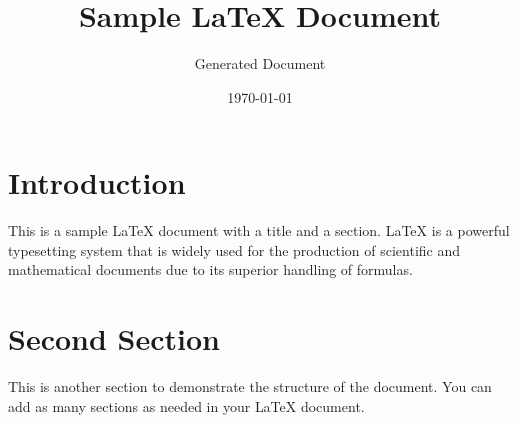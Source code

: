 \documentclass{article}
\title{Sample LaTeX Document}
\author{Generated Document}
\date{\today}
\begin{document}
\maketitle

\section{Introduction}
This is a sample LaTeX document with a title and a section. LaTeX is a powerful typesetting system that is widely used for the production of scientific and mathematical documents due to its superior handling of formulas.

\section{Second Section}
This is another section to demonstrate the structure of the document. You can add as many sections as needed in your LaTeX document.
\end{document}
